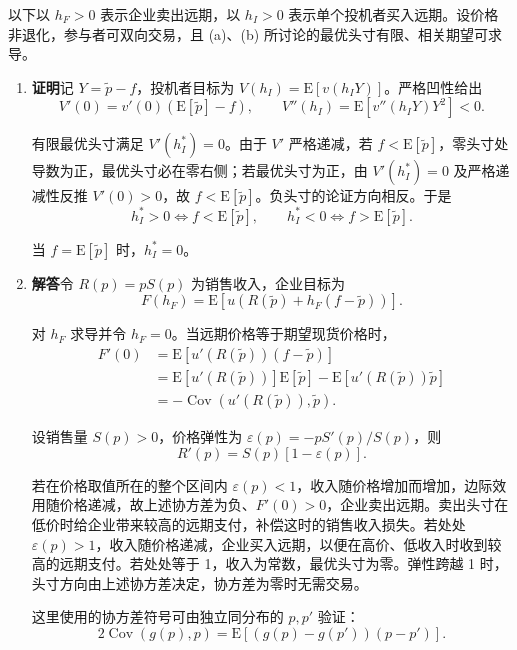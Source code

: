 \begin{solution}[blank-type=manual,blank-vsep=12\baselineskip]
以下以 $h_F>0$ 表示企业卖出远期，以 $h_I>0$ 表示单个投机者买入远期。设价格非退化，参与者可双向交易，且 (a)、(b) 所讨论的最优头寸有限、相关期望可求导。
\begin{enumerate}[label=(\alph*)]
\item \textbf{证明}\quad 记 $Y=\widetilde p-f$，投机者目标为 $V(h_I)=\mathrm E[v(h_IY)]$。严格凹性给出
\[
 V'(0)=v'(0)(\mathrm E[\widetilde p]-f),\qquad
 V''(h_I)=\mathrm E[v''(h_IY)Y^2]<0.
\]

有限最优头寸满足 $V'(h_I^*)=0$。由于 $V'$ 严格递减，若 $f<\mathrm E[\widetilde p]$，零头寸处导数为正，最优头寸必在零右侧；若最优头寸为正，由 $V'(h_I^*)=0$ 及严格递减性反推 $V'(0)>0$，故 $f<\mathrm E[\widetilde p]$。负头寸的论证方向相反。于是
\[
 h_I^*>0\iff f<\mathrm E[\widetilde p],\qquad
 h_I^*<0\iff f>\mathrm E[\widetilde p].
\]

当 $f=\mathrm E[\widetilde p]$ 时，$h_I^*=0$。

\item \textbf{解答}\quad 令 $R(p)=pS(p)$ 为销售收入，企业目标为
\[
 F(h_F)=\mathrm E[u(R(\widetilde p)+h_F(f-\widetilde p))].
\]

对 $h_F$ 求导并令 $h_F=0$。当远期价格等于期望现货价格时，
\[
 \begin{aligned}
 F'(0)&=\mathrm E[u'(R(\widetilde p))(f-\widetilde p)]\\
 &=\mathrm E[u'(R(\widetilde p))]\mathrm E[\widetilde p]
   -\mathrm E[u'(R(\widetilde p))\widetilde p]\\
 &=-\operatorname{Cov}(u'(R(\widetilde p)),\widetilde p).
 \end{aligned}
\]

设销售量 $S(p)>0$，价格弹性为 $\varepsilon(p)=-pS'(p)/S(p)$，则
\[
 R'(p)=S(p)[1-\varepsilon(p)].
\]

若在价格取值所在的整个区间内 $\varepsilon(p)<1$，收入随价格增加而增加，边际效用随价格递减，故上述协方差为负、$F'(0)>0$，企业卖出远期。卖出头寸在低价时给企业带来较高的远期支付，补偿这时的销售收入损失。若处处 $\varepsilon(p)>1$，收入随价格递减，企业买入远期，以便在高价、低收入时收到较高的远期支付。若处处等于 1，收入为常数，最优头寸为零。弹性跨越 1 时，头寸方向由上述协方差决定，协方差为零时无需交易。

这里使用的协方差符号可由独立同分布的 $p,p'$ 验证：
\[
 2\operatorname{Cov}(g(p),p)
 =\mathrm E[(g(p)-g(p'))(p-p')].
\]


\end{enumerate}
\end{solution}
